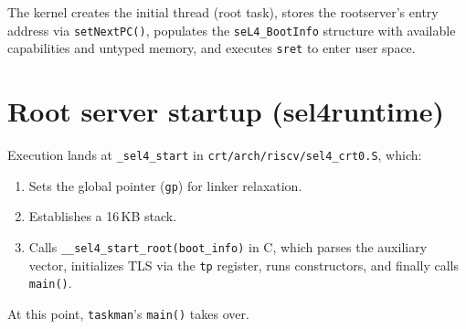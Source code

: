 The kernel creates the initial thread (root task), stores the
rootserver's entry address via \texttt{setNextPC()}, populates the
\texttt{seL4\_BootInfo} structure with available capabilities and
untyped memory, and executes \texttt{sret} to enter user space.

\section{Root server startup (sel4runtime)}

Execution lands at \texttt{\_sel4\_start} in
\texttt{crt/arch/riscv/sel4\_crt0.S}, which:
\begin{enumerate}
    \item Sets the global pointer (\texttt{gp}) for linker relaxation.
    \item Establishes a 16\,KB stack.
    \item Calls \texttt{\_\_sel4\_start\_root(boot\_info)} in C, which
          parses the auxiliary vector, initializes TLS via the \texttt{tp}
          register, runs constructors, and finally calls \texttt{main()}.
\end{enumerate}

At this point, \texttt{taskman}'s \texttt{main()} takes over.
